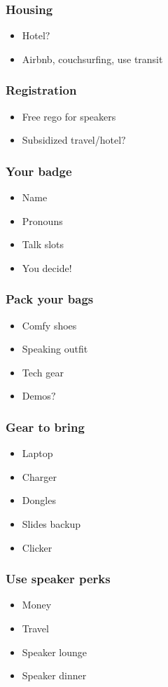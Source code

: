 \documentclass{beamer}
\begin{document}
\begin{frame}[fragile]
\frametitle{Housing}
\begin{itemize}
\item Hotel$?$
\item Airbnb, couchsurfing, use transit
\end{itemize}
\end{frame}

\begin{frame}[fragile]
\frametitle{Registration}
\begin{itemize}
\item Free rego for speakers
\item Subsidized travel/hotel$?$
\end{itemize}
\end{frame}

\begin{frame}[fragile]
\frametitle{Your badge}
\begin{itemize}
\item Name
\item Pronouns
\item Talk slots
\item You decide!
\end{itemize}
\end{frame}

\begin{frame}[fragile]
\frametitle{Pack your bags}
\begin{itemize}
\item Comfy shoes
\item Speaking outfit
\item Tech gear
\item Demos$?$
\end{itemize}
\end{frame}

\begin{frame}[fragile]
\frametitle{Gear to bring}
\begin{itemize}
\item Laptop
\item Charger
\item Dongles
\item Slides backup
\item Clicker
\end{itemize}
\end{frame}


\begin{frame}[fragile]
\frametitle{Use speaker perks}
\begin{itemize}
\item Money
\item Travel
\item Speaker lounge
\item Speaker dinner
\end{itemize}
\end{frame}
\end{document}
